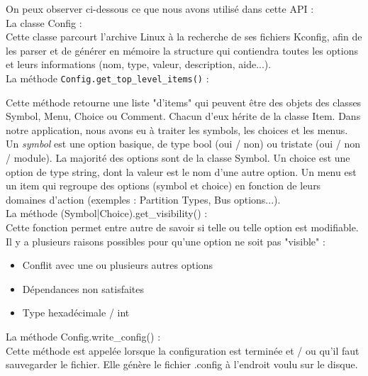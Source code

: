 \documentclass[16pts]{report}
\begin{document}
    On peux observer ci-dessous ce que nous avons utilisé dans cette API : \\

    La classe Config :\\

        Cette classe parcourt l'archive Linux à la recherche de ses fichiers Kconfig, 
        afin de les parser et de générer en mémoire la structure qui 
        contiendra toutes les options et leurs informations (nom, type, valeur, description, aide...). \\

    La méthode \verb|Config.get_top_level_items()| :

        Cette méthode retourne une liste "d'items" qui peuvent être des objets des 
        classes Symbol, Menu, Choice ou Comment. Chacun d'eux hérite de la classe Item.
        Dans notre application, nous avons eu à traiter les symbols, les choices et
        les menus.\\

        Un \textit{symbol} est une option basique, de type bool (oui / non) ou tristate (oui /
        non / module). La majorité des options sont de la classe Symbol.
        Un choice est une option de type string, dont la valeur est le nom d'une autre
        option.
        Un menu est un item qui regroupe des options (symbol et choice) en fonction 
        de leurs domaines d'action (exemples : Partition Types, Bus options...).\\

    La méthode (Symbol|Choice).get\_visibility() : \\
       
        Cette fonction permet entre autre de savoir si telle ou telle option est 
        modifiable. Il y a plusieurs raisons possibles pour qu'une option ne soit pas
        "visible" :
        \begin{itemize}
            \item Conflit avec une ou plusieurs autres options
            \item Dépendances non satisfaites
            \item Type hexadécimale / int
        \end{itemize}

    La méthode Config.write\_config() :\\
       
        Cette méthode est appelée lorsque la configuration est terminée et / ou qu'il 
        faut sauvegarder le fichier. Elle génère le fichier .config à l'endroit voulu sur le
        disque.\\
\end{document}
